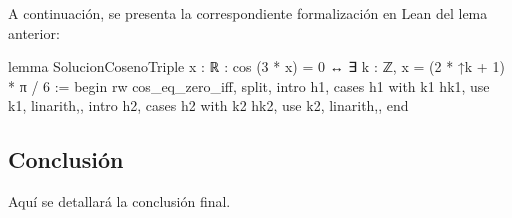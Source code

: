 A continuación, se presenta la correspondiente formalización
en Lean del lema anterior:
\begin{leancode}
lemma SolucionCosenoTriple {x : ℝ} : cos (3 * x) = 0 ↔ 
∃ k : ℤ, x = (2 * ↑k + 1) * π / 6 :=
begin
  rw cos_eq_zero_iff,
  split,
  {intro h1,
  cases h1 with k1 hk1,
  use k1,
  linarith,},
  {intro h2,
  cases h2 with k2 hk2,
  use k2,
  linarith,},
end
\end{leancode}


\subsection{Conclusión}
Aquí se detallará la conclusión final.